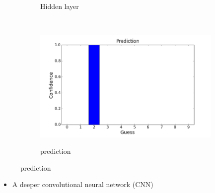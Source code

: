 \begin{frame}[plain]
\begin{figure}
\begin{subfigure}{0.1\textwidth}
\end{subfigure}
\begin{subfigure}{0.3\textwidth}
\caption*{Hidden layer}
\end{subfigure}
\\\vspace{-0.2cm}
\begin{subfigure}{0.55\textwidth}
\includegraphics[width=\textwidth]{cnn_prediction}
\end{subfigure}
\begin{subfigure}{0.3\textwidth}
\caption{prediction}
\end{subfigure}


\end{figure}
\end{frame}


\begin{frame}[c]
\begin{itemize}
\centering
\item A deeper convolutional neural network (CNN)
\end{itemize}
\end{frame}


